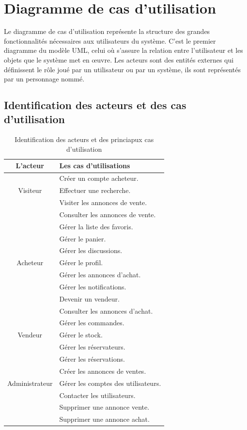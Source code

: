 \documentclass[edit,12pt,a4paper,ChapStyle,oneside,doubleinterligne]{report}
\begin{document}
\section{Diagramme de cas d'utilisation}

Le diagramme de cas d’utilisation représente la structure des grandes fonctionnalités
nécessaires aux utilisateurs du système. C’est le premier diagramme du modèle UML,
celui où s’assure la relation entre l’utilisateur et les objets que le système met en œuvre.
Les acteurs sont des entités externes qui définissent le rôle joué par un utilisateur ou par
un système, ils sont représentés par un personnage nommé\cite{usecas}. 
\subsection{Identification des acteurs et des cas d'utilisation}
\begin{table}[h!]
    \centering
    \begin{tabular}{|c|l|}
    \hline
        L’acteur    & Les cas d’utilisations\\ \hline
                    & Créer un compte acheteur. \\
        Visiteur    & Effectuer une recherche.\\
                    & Visiter les annonces de vente.\\ \hline
                    & Consulter les annonces de vente.\\
                    & Gérer la liste des favoris.\\
                    & Gérer le panier.\\
                    & Gérer les discussions.\\
        Acheteur    & Gérer le profil.\\
                    & Gérer les annonces d'achat.\\
                    & Gérer les notifications.\\
                    & Devenir un vendeur.\\ \hline
                    & Consulter les annonces d'achat.\\
                    & Gérer les commandes.\\
        Vendeur     & Gérer le stock.\\
                    & Gérer les réservateurs.\\
                    & Gérer les réservations.\\
                    & Créer les annonces de ventes. \\ \hline
    Administrateur  & Gérer les comptes des utilisateurs.\\
                    & Contacter les utilisateurs.\\
                    & Supprimer une annonce vente. \\
                    & Supprimer une annonce achat.   \\\hline
    \end{tabular}
    \caption{Identification des acteurs et des princiapux cas d'utilisation}
    \label{tab:Identification des cas d’utilisations}
\end{table}
\end{document}
